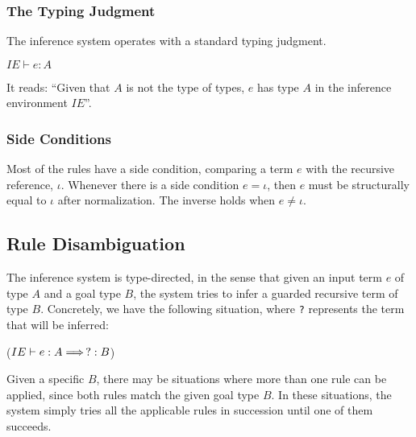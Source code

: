 \subsubsection{The Typing Judgment}
The inference system operates with a standard typing judgment.
\begin{center}
  ${IE\vdash e : A}$
\end{center}
It reads: ``Given that $A$ is not the type of types, $e$ has type $A$ in the inference
environment $IE$''.


\subsubsection{Side Conditions}
Most of the rules have a side condition, comparing a term $e$ with the recursive
reference, $\iota$. Whenever there is a side condition $e = \iota$, then $e$
must be structurally equal to $\iota$ after normalization. The inverse holds when
$e \not = \iota$.

\subsection{Rule Disambiguation}
The inference system is type-directed, in the sense that given an input term $e$
of type $A$ and a goal type $B$, the system tries to infer a guarded recursive
term of type $B$. Concretely, we have the following situation, where \texttt{?}
represents the term that will be inferred:
\begin{center}
  (${IE\vdash e : A \Longrightarrow\, ? : B}$)
\end{center}
Given a specific $B$, there may be situations where more than one rule can be
applied, since both rules match the given goal type $B$. In these situations,
the system simply tries all the applicable rules in succession until one of them succeeds.

